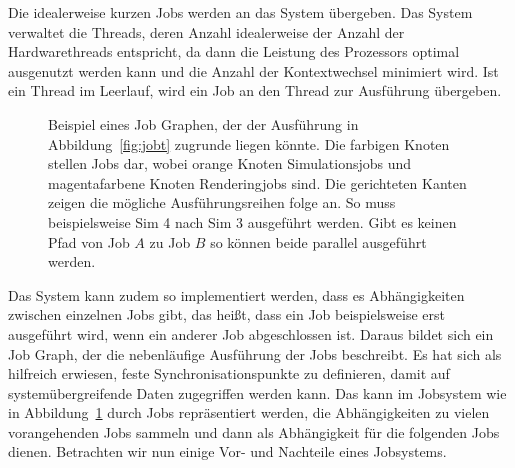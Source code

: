 Die idealerweise kurzen Jobs werden an das System übergeben. Das System verwaltet die Threads, deren Anzahl idealerweise der Anzahl der Hardwarethreads entspricht, da dann die Leistung des Prozessors optimal ausgenutzt werden kann und die Anzahl der Kontextwechsel minimiert wird. Ist ein Thread im Leerlauf, wird ein Job an den Thread zur Ausführung übergeben.

\begin{figure}
	\centering
	\caption{Beispiel eines Job Graphen, der der Ausführung in Abbildung~\ref{fig:jobt} zugrunde liegen könnte. Die farbigen Knoten stellen Jobs dar, wobei orange Knoten Simulationsjobs und magentafarbene Knoten Renderingjobs sind. Die gerichteten Kanten zeigen die mögliche Ausführungsreihen folge an. So muss beispielsweise Sim 4 nach Sim 3 ausgeführt werden. Gibt es keinen Pfad von Job $A$ zu Job $B$ so können beide parallel ausgeführt werden.}\label{fig:jobdependencies}
\end{figure}
Das System kann zudem so implementiert werden, dass es Abhängigkeiten zwischen einzelnen Jobs gibt, das heißt, dass ein Job beispielsweise erst ausgeführt wird, wenn ein anderer Job abgeschlossen ist. Daraus bildet sich ein Job Graph, der die nebenläufige Ausführung der Jobs beschreibt. Es hat sich als hilfreich erwiesen, feste Synchronisationspunkte zu definieren, damit auf systemübergreifende Daten zugegriffen werden kann. Das kann im Jobsystem wie in Abbildung~\ref{fig:jobdependencies} durch Jobs repräsentiert werden, die Abhängigkeiten zu vielen vorangehenden Jobs sammeln und dann als Abhängigkeit für die folgenden Jobs dienen. Betrachten wir nun einige Vor- und Nachteile eines Jobsystems.
